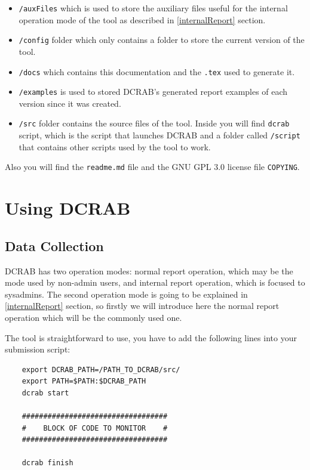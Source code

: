 \documentclass[10pt,a4paper]{report}
\begin{document}
\begin{itemize}
  \item \verb+/auxFiles+ which is used to store the auxiliary files useful for the internal operation mode of the tool as described in \ref{internalReport} section.
  \item \verb+/config+ folder which only contains a folder to store the current version of the tool.
  \item \verb+/docs+ which contains this documentation and the \verb+.tex+ used to generate it.
  \item \verb+/examples+ is used to stored DCRAB's generated report examples of each version since it was created.
  \item \verb+/src+ folder contains the source files of the tool. Inside you will find \verb+dcrab+ script, which is the script that launches DCRAB and a folder called \verb+/script+ that contains other scripts used by the tool to work.
\end{itemize}

Also you will find the \verb+readme.md+ file and the GNU GPL 3.0 license file \verb+COPYING+.

\chapter{Using DCRAB}

\section{Data Collection}
\label{dataCollection}
DCRAB has two operation modes: normal report operation, which may be the mode used by non-admin users, and internal report operation, which is focused to sysadmins. The second operation mode is going to be explained in \ref{internalReport} section, so firstly we will introduce here the normal report operation which will be the commonly used one.

The tool is straightforward to use, you have to add the following lines into your submission script:

\begin{verbatim}
    export DCRAB_PATH=/PATH_TO_DCRAB/src/
    export PATH=$PATH:$DCRAB_PATH
    dcrab start

    ##################################
    #    BLOCK OF CODE TO MONITOR    #
    ##################################

    dcrab finish
\end{verbatim}
\end{document}
